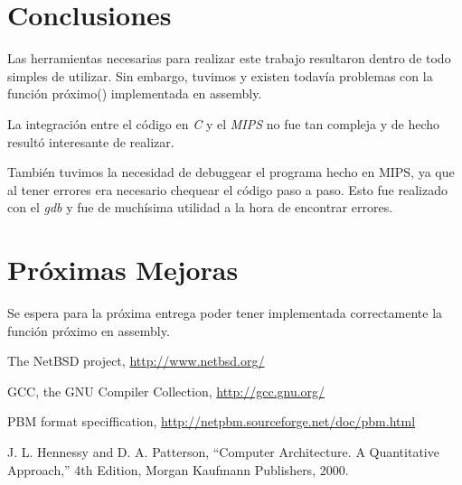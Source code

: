 \documentclass[9pt,a4paper]{article}
\begin{document}
\section{Conclusiones}

Las herramientas necesarias para realizar este trabajo resultaron dentro de todo simples de utilizar. Sin embargo, tuvimos y existen todavía problemas con la función próximo() implementada en assembly. 
\par

La integración entre el código en \textit{C} y el \textit{MIPS} no fue tan compleja y de hecho resultó interesante de realizar. 
\par

También tuvimos la necesidad de debuggear el programa hecho en MIPS, ya que al tener errores era necesario chequear el código paso a paso. Esto fue realizado con el \textit{gdb} y fue de muchísima utilidad a la hora de encontrar errores.

\section{Próximas Mejoras}

Se espera para la próxima entrega poder tener implementada correctamente la función próximo en assembly.

\bigskip

\newpage
\begin{thebibliography}{99}
 The NetBSD project, \url{http://www.netbsd.org/}

 GCC, the GNU Compiler Collection, \url{http://gcc.gnu.org/}

 PBM format speciffication, \url{http://netpbm.sourceforge.net/doc/pbm.html}

 J. L. Hennessy and D. A. Patterson, ``Computer Architecture. A Quantitative
Approach,'' 4th Edition, Morgan Kaufmann Publishers, 2000.

\end{thebibliography}


\newpage
\end{document}
